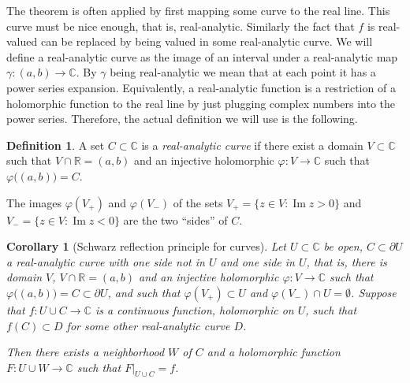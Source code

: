 \documentclass[12pt,openany]{book}
\renewcommand{\Im}{\operatorname{Im}}
\newcommand{\C}{{\mathbb{C}}}
\newcommand{\R}{{\mathbb{R}}}
\newcommand{\myquote}[1]{``#1''}
\theoremstyle{plain}
\newtheorem{cor}[thm]{Corollary}
\theoremstyle{remark}
\theoremstyle{definition}
\newtheorem{defn}[thm]{Definition}
\theoremstyle{exercise}
\theoremstyle{example}
\begin{document}
The theorem is often applied by first mapping some curve to the real line.
This curve must be nice enough, that is, real-analytic.  Similarly the fact
that $f$ is real-valued can be replaced by being valued in some
real-analytic curve.
We will define a real-analytic curve as the image of
an interval under a
real-analytic map $\gamma \colon (a,b) \to \C$.
By $\gamma$ being real-analytic we mean that at each point it has a power
series expansion.  Equivalently, a real-analytic function is a
restriction of a holomorphic function to the real line by just plugging
complex numbers into the power series.  Therefore, the actual definition we
will use is the following.

\begin{defn}
A set $C \subset \C$ is a \emph{real-analytic curve}
if there exist a domain $V \subset \C$ such that
$V \cap \R = (a,b)$ and an injective holomorphic $\varphi \colon V \to \C$
such that $\varphi\bigl( (a,b) \bigr) = C$.
\end{defn}

The images $\varphi(V_+)$ and $\varphi(V_-)$ of the sets
$V_+ = \{ z \in V : \Im z > 0 \}$ and $V_- = \{ z \in V : \Im z < 0 \}$
are the two \myquote{sides} of $C$.

\begin{cor}[Schwarz reflection principle for curves]
Let $U \subset \C$ be open,
$C \subset \partial U$ a real-analytic curve with one side
not in $U$ and one side in $U$, that is, there is domain $V$,
$V \cap \R = (a,b)$ and an injective holomorphic $\varphi \colon V \to \C$
such that $\varphi\bigl( (a,b) \bigr) = C \subset \partial U$,
and such that $\varphi(V_+) \subset U$ and $\varphi(V_-) \cap U =
\emptyset$.  Suppose that $f \colon U \cup C \to \C$ is a continuous
function, holomorphic on $U$, such that $f(C) \subset D$ for some
other real-analytic curve $D$.

Then there exists a neighborhood $W$ of $C$ and a holomorphic
function $F \colon U \cup W \to \C$ such that $F|_{U \cup C} = f$.
\end{cor}
\end{document}
